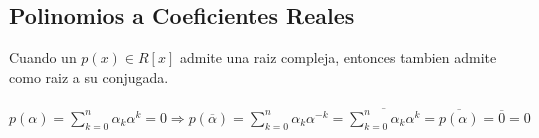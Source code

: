 \documentclass[10pt]{article}
\begin{document}
\subsection{Polinomios a Coeficientes Reales}
Cuando un $p(x) \in R[x]$ admite una raiz compleja, entonces tambien admite como raiz a su conjugada.\\
\\
$p(\alpha) = \sum\limits_{k=0}^n\alpha_k \alpha^k=0 \Rightarrow p(\overline{\alpha}) = \sum\limits_{k=0}^n\alpha_k \alpha^{-k}= \overline{\sum\limits_{k=0}^n\alpha_k \alpha^{k}} = \overline{p(\alpha)} = \overline{0} = 0$
\end{document}
